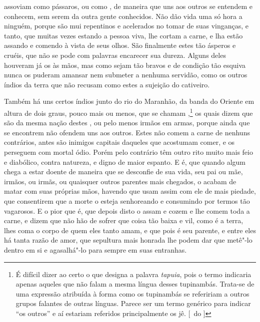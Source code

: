 assoviam como pássaros, ou como , de maneira que uns aos outros
se entendem e conhecem, sem serem da outra gente conhecidos. Não dão
vida uma só hora a ninguém, porque são mui repentinos e acelerados no
tomar de suas vinganças, e tanto, que muitas vezes estando a pessoa
viva, lhe cortam a carne, e lha estão assando e comendo à vista de seus \EP[1]
olhos. São finalmente estes  tão ásperos e cruéis, que não se
pode com palavras encarecer sua dureza. Alguns deles houveram já os			%
 às mãos, mas como sejam tão bravos e de condição tão
esquiva nunca os puderam amansar nem submeter a nenhuma servidão, como os		
outros índios da terra que não recusam como estes a sujeição do cativeiro.

Também há uns certos índios junto do rio do Maranhão, da banda do		%
Oriente em altura de dois graus, pouco mais ou menos, que se chamam
,\footnote{É difícil dizer ao certo o que designa a palavra \textit{tapuia},  
pois o termo indicaria apenas aqueles que não falam a mesma língua desses tupinambás. Trata-se de uma
expressão atribuída à forma como os tupinambás se refeririam a outros
grupos falantes de outras línguas. Parece ser um termo genérico para
indicar ``os outros'' e aí estariam referidos principalmente os jê. [~do ]}  
os quais dizem que são da mesma nação destes , ou pelo %
menos irmãos em armas, porque ainda que se encontrem não ofendem uns			%
aos outros. Estes  não comem a carne de nenhuns contrários, 
antes são inimigos capitais daqueles que acostumam comer, e os
perseguem com mortal ódio. Porém pelo contrário têm outro rito muito
mais feio e diabólico, contra natureza, e digno de maior espanto. E é,
que quando algum chega a estar doente de maneira que se desconfie de
sua vida, seu pai ou mãe, irmãos, ou irmãs, ou quaisquer outros
parentes mais chegados, o acabam de matar com suas próprias mãos,			%
havendo que usam assim com ele de mais piedade, que consentirem que a
morte o esteja senhoreando e consumindo por termos tão vagarosos. E o
pior que é, que depois disto o assam e cozem e lhe comem toda a carne,
e dizem que não hão de sofrer que coisa tão baixa e vil, como é a
terra, lhes coma o corpo de quem eles tanto amam, e que pois é seu
parente, e entre eles há tanta razão de amor, que sepultura mais
honrada lhe podem dar que metê"-lo dentro em si e agasalhá"-lo para			%
sempre em suas entranhas.

